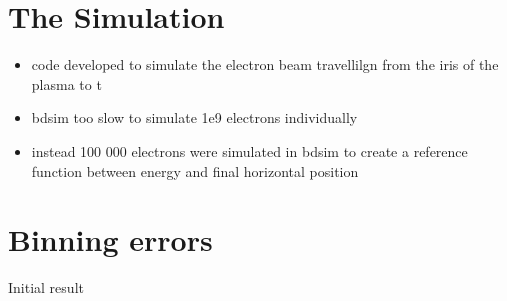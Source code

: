 \documentclass[a4paper]{report}
\begin{document}



\section{The Simulation}

\begin{itemize}
	\item code developed to simulate the electron beam travellilgn from the
		iris of the plasma to t
	\item bdsim too slow to simulate 1e9 electrons individually
	\item instead 100 000 electrons were simulated in bdsim to create a
		reference function between energy and final horizontal position
\end{itemize}

\section{Binning errors}

Initial result



\end{document}
